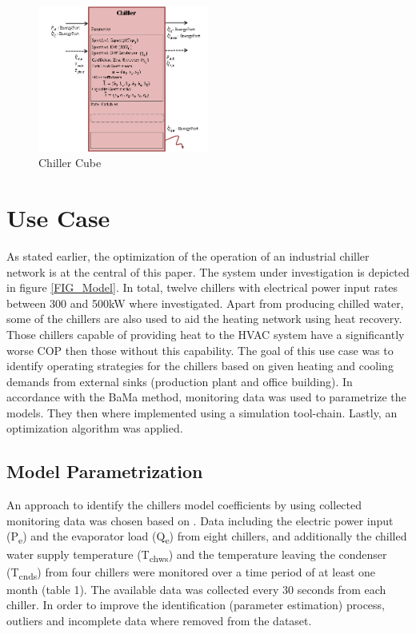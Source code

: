 \documentclass[3p,times,procedia,twocolumn,twoside]{elsarticle}
\begin{document}
\begin{figure}
	\includegraphics[width=0.5\textwidth]{figures/Chiller_Cube}
	\caption{Chiller Cube}
	\label{FIG_Cube}
\end{figure}
\section{Use Case}
As stated earlier, the optimization of the operation of an industrial chiller network is at the central of this paper. The system under investigation is depicted in figure \ref{FIG_Model}. In total, twelve chillers with electrical power input rates between 300 and 500kW where investigated. Apart from producing chilled water, some of the chillers are also used to aid the heating network using heat recovery. Those chillers capable of providing heat to the HVAC system have a significantly worse COP then those without this capability. The goal of this use case was to identify operating strategies for the chillers based on given heating and cooling demands from external sinks (production plant and office building). In accordance with the BaMa method, monitoring data was used to parametrize the models. They then where implemented using a simulation tool-chain. Lastly, an optimization algorithm was applied. 

\subsection{Model Parametrization}
An approach to identify the chillers model coefficients by using collected monitoring data was chosen based on \cite{Monfet}. Data including the electric power input (P\textsubscript{e}) and the evaporator load (Q\textsubscript{e}) from eight chillers, and additionally the chilled water supply temperature (T\textsubscript{chws}) and the temperature leaving the condenser (T\textsubscript{cnds}) from four chillers were monitored over a time period of at least one month (table 1). The available data was collected every 30 seconds from each chiller. In order to improve the identification (parameter estimation) process, outliers and incomplete data where removed from the dataset. 
\end{document}
